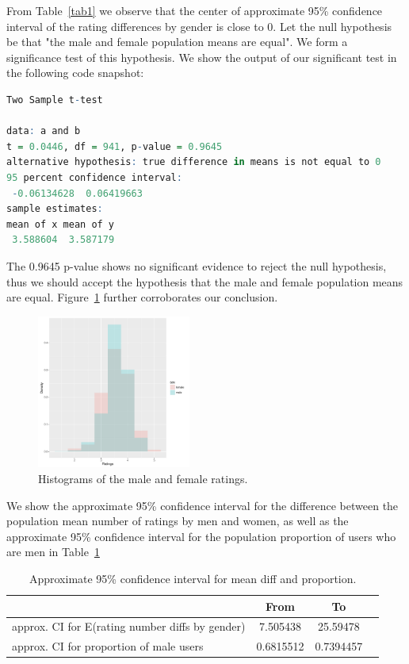 \documentclass[12pt]{elsarticle}
\begin{document}
From Table~\ref{tab1} we observe that the center of approximate 95\% confidence interval of the rating differences by gender is close to 0. Let the null hypothesis be that "the male and female population means are equal". We form a significance test of this hypothesis. We show the output of our significant test in the following code snapshot:
\begin{lstlisting}[language=R]
Two Sample t-test

data: a and b
t = 0.0446, df = 941, p-value = 0.9645
alternative hypothesis: true difference in means is not equal to 0
95 percent confidence interval:
 -0.06134628  0.06419663
sample estimates:
mean of x mean of y 
 3.588604  3.587179
\end{lstlisting}
The 0.9645 p-value shows no significant evidence to reject the null hypothesis, thus we should accept the hypothesis that the male and female population means are equal. Figure~\ref{fig1} further corroborates our conclusion.
\begin{figure}[h!]
\centering\includegraphics[width=0.45\textwidth]{ratings.pdf}
\caption{Histograms of the male and female ratings.}
\label{fig1}
\end{figure}

We show the approximate 95\% confidence interval for the difference between the population mean number of ratings by men and women, as well as the approximate 95\% confidence interval for the population proportion of users who are men in Table~\ref{tab2}
\begin{table}[h]
\begin{tabular}{l*{2}{c}r}
                 & From & To \\
\hline
approx. CI for E(rating number diffs by gender) & 7.505438 & 25.59478\\
approx. CI for proportion of male users & 0.6815512 & 0.7394457 \\
\end{tabular}
\caption{Approximate 95\% confidence interval for mean diff and proportion.}
\label{tab2}
\end{table}
\end{document}
